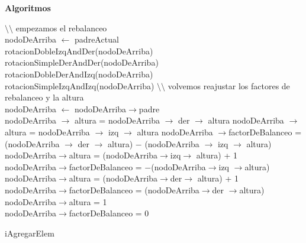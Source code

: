 \documentclass[a4paper,10pt]{article}
\newenvironment{Algoritmos}{%
  \vspace*{2ex}%
  \noindent\textbf{\Large Algoritmos}%
  \vspace*{2ex}%
}{}
\begin{document}
\begin{Algoritmos}
\begin{algorithm}[H]
{$\setminus$$\setminus$ empezamos el rebalanceo\\}
{
{nodoDeArriba $\leftarrow$ padreActual\\
{
{
{
{
{rotacionDobleIzqAndDer(nodoDeArriba)}
{rotacionSimpleDerAndDer(nodoDeArriba)}
}
{}
{
{
{rotacionDobleDerAndIzq(nodoDeArriba)}
{rotacionSimpleIzqAndIzq(nodoDeArriba)}
}
{}
}
}
{}
}
}
}
{}
{$\setminus$$\setminus$ volvemos reajustar los factores de rebalanceo y la altura\\}
{{nodoDeArriba $\leftarrow$ nodoDeArriba$\rightarrow$padre \\}
{
{
    {
    {nodoDeArriba $\rightarrow$ altura = nodoDeArriba $\rightarrow$ der $\rightarrow$ altura}
    {nodoDeArriba $\rightarrow$ altura = nodoDeArriba $\rightarrow$ izq $\rightarrow$ altura}
    {nodoDeArriba $\rightarrow$factorDeBalanceo = (nodoDeArriba $\rightarrow$ der $\rightarrow$ altura) $-$ (nodoDeArriba $\rightarrow$ izq $\rightarrow$ altura)}
    }
    {
    {nodoDeArriba$\rightarrow$altura = (nodoDeArriba$\rightarrow$izq$\rightarrow$ altura) + 1 \\
    nodoDeArriba$\rightarrow$factorDeBalanceo = $-$(nodoDeArriba$\rightarrow$izq $\rightarrow$altura)}
    {
    {nodoDeArriba$\rightarrow$altura = (nodoDeArriba$\rightarrow$der$\rightarrow$ altura) + 1 \\
    nodoDeArriba$\rightarrow$factorDeBalanceo = (nodoDeArriba$\rightarrow$der $\rightarrow$altura)}
    {nodoDeArriba$\rightarrow$altura = 1\\
    nodoDeArriba$\rightarrow$factorDeBalanceo = 0}
    }
    }
    }
    {}
    }
}
}
     \caption{iAgregarElem}
\end{algorithm}
\newpage

\end{Algoritmos}
\end{document}
